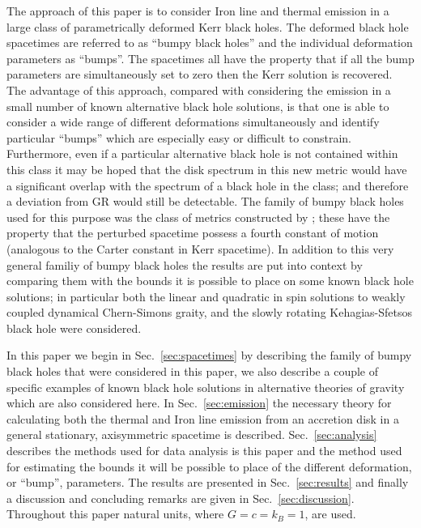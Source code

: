 The approach of this paper is to consider Iron line and thermal emission in a large class of parametrically deformed Kerr black holes. The deformed black hole spacetimes are referred to as ``bumpy black holes'' and the individual deformation parameters as ``bumps''. The spacetimes all have the property that if all the bump parameters are simultaneously set to zero then the Kerr solution is recovered. The advantage of this approach, compared with considering the emission in a small number of known alternative black hole solutions, is that one is able to consider a wide range of different deformations simultaneously and identify particular ``bumps'' which are especially easy or difficult to constrain. Furthermore, even if a particular alternative black hole is not contained within this class it may be hoped that the disk spectrum in this new metric would have a significant overlap with the spectrum of a black hole in the class; and therefore a deviation from GR would still be detectable. The family of bumpy black holes used for this purpose was the class of metrics constructed by \cite{2011PhRvD..83j4027V}; these have the property that the perturbed spacetime possess a fourth constant of motion (analogous to the Carter constant \citep{PhysRev.174.1559} in Kerr spacetime). In addition to this very general familiy of bumpy black holes the results are put into context by comparing them with the bounds it is possible to place on some known black hole solutions; in particular both the linear \cite{2009PhRvD..79h4043Y} and quadratic \citep{2012PhRvD..86d4037Y} in spin solutions to weakly coupled dynamical Chern-Simons graity, and the slowly rotating Kehagias-Sfetsos black hole \citep{2010EPJC...70..367L} were considered.

In this paper we begin in Sec.\ \ref{sec:spacetimes} by describing the family of bumpy black holes that were considered in this paper, we also describe a couple of specific examples of known black hole solutions in alternative theories of gravity which are also considered here. In Sec.\ \ref{sec:emission} the necessary theory for calculating both the thermal and Iron line emission from an accretion disk in a general stationary, axisymmetric spacetime is described. Sec.\ \ref{sec:analysis} describes the methods used for data analysis is this paper and the method used for estimating the bounds it will be possible to place of the different deformation, or ``bump'', parameters. The results are presented in Sec.\ \ref{sec:results} and finally a discussion and concluding remarks are given in Sec.\ \ref{sec:discussion}. Throughout this paper natural units, where $G=c=k_{B}=1$, are used.


